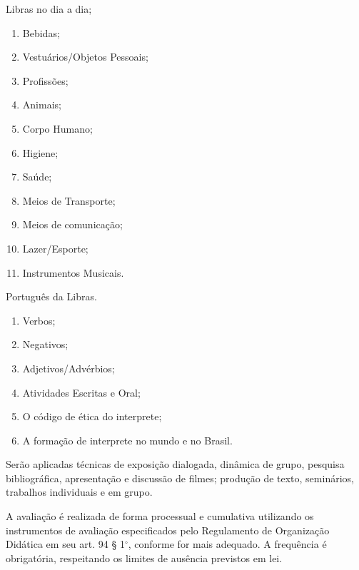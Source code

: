 \begin{pud}
\begin{description}[itemsep=0em]
	    \item[UNIDADE II:] Libras no dia a dia;
	         \begin{enumerate}[itemsep=0em, topsep=0em]
				\item   Bebidas;
				\item  Vestuários/Objetos Pessoais;
				\item  Profissões;
				\item Animais;
				\item  Corpo Humano;
				\item  Higiene;
				\item  Saúde;
				\item  Meios de Transporte;
				\item  Meios de comunicação;
				\item  Lazer/Esporte;
				\item  Instrumentos Musicais.
	        \end{enumerate}
	
		\item[UNIDADE III:] Português da Libras.
	         \begin{enumerate}[itemsep=0em, topsep=0em]
				\item Verbos;
				\item Negativos;
				\item Adjetivos/Advérbios;
				\item Atividades Escritas e Oral;
				\item O código de ética do interprete;
				\item A formação de interprete no mundo e no Brasil.
	        \end{enumerate}
	                                
	
	\end{description}
	
	\metodologia
	Serão aplicadas técnicas de exposição dialogada, dinâmica de grupo, pesquisa bibliográfica, apresentação e discussão de filmes; produção de texto, seminários, trabalhos individuais e em grupo.
	
	\avaliacao
	A  avaliação é realizada de forma processual e cumulativa utilizando os instrumentos de avaliação especificados pelo Regulamento de Organização Didática em seu art. 94 § 1$^\circ$, conforme for mais adequado. A frequência é obrigatória, respeitando os limites de ausência previstos em lei.
	

\end{pud}
